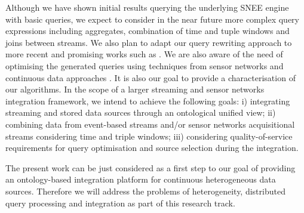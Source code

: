 Although we have shown initial results querying the underlying SNEE engine with basic queries, we expect to consider in
the near future more complex query expressions including aggregates, combination of time and tuple windows and joins
between streams. We also plan to adapt our query rewriting approach to more recent and promising works such as
\cite{PerezUrbina_09}. We are also aware of the need of optimising the generated queries using techniques from sensor
networks and continuous data approaches \cite{Abadi_2005,Arasu_06a,Galpin_09}. It is also our goal to provide a
characterisation of our algorithms. In the scope of a larger streaming and sensor networks integration framework, we
intend to achieve the following goals: i) integrating streaming and stored data sources through an ontological unified
view; ii) combining data from event-based streams and/or sensor networks acquisitional streams considering time and
triple windows; iii) considering quality-of-service requirements for query optimisation and source selection during the
integration.

The present work can be just considered as a first step to our goal of providing an ontology-based integration platform
for continuous heterogeneous data sources. Therefore we will address the problems of heterogeneity, distributed query
processing and integration as part of this research track.

